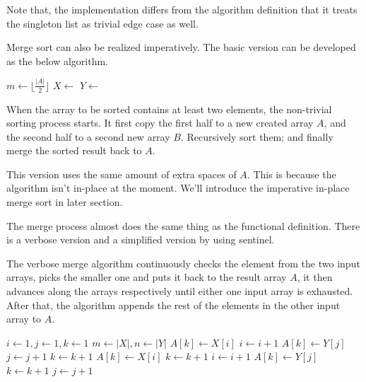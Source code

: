\documentclass[UTF8]{article}
\begin{document}
Note that, the implementation differs from the algorithm definition that it treats the singleton
list as trivial edge case as well.

Merge sort can also be realized imperatively. The basic version can be developed as the below algorithm.

\begin{algorithmic}[1]
    \State $m \gets \lfloor \frac{|A|}{2} \rfloor$
    \State $X \gets$ 
    \State $Y \gets$ 
    \State {}
    \State {}
    \State {}
  \EndIf
\EndProcedure
\end{algorithmic}

When the array to be sorted contains at least two elements, the non-trivial sorting process starts.
It first copy the first half to a new created array $A$, and the second half to a second new array $B$.
Recursively sort them; and finally merge the sorted result back to $A$.

This version uses the same amount of extra spaces of $A$. This is because the  algorithm
isn't in-place at the moment. We'll introduce the imperative in-place merge sort in later section.

The merge process almost does the same thing as the functional definition. There is a verbose version
and a simplified version by using sentinel.

The verbose merge algorithm continuously checks the element from the two input arrays, picks the smaller one
and puts it back to the result array $A$, it then advances along the arrays respectively until either
one input array is exhausted. After that, the algorithm appends the rest of the elements in the other
input array to $A$.

\begin{algorithmic}[1]
  \State $i \gets 1, j\gets 1, k\gets 1$
  \State $m \gets |X|, n \gets |Y|$
      \State $A[k] \gets X[i]$
      \State $i \gets i + 1$
    \Else
      \State $A[k] \gets Y[j]$
      \State $j \gets j + 1$
    \EndIf
    \State $k \gets k + 1$
  \EndWhile
    \State $A[k] \gets X[i]$
    \State $k \gets k + 1$
    \State $i \gets i + 1$
  \EndWhile
    \State $A[k] \gets Y[j]$
    \State $k \gets k + 1$
    \State $j \gets j + 1$
  \EndWhile
\EndProcedure
\end{algorithmic}
\end{document}

